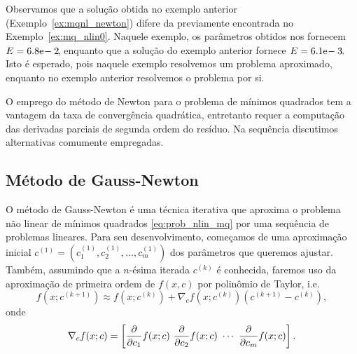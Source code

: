 \begin{ex}





\end{ex}

Observamos que a solução obtida no exemplo anterior (Exemplo~\ref{ex:mqnl_newton}) difere da previamente encontrada no Exemplo~\ref{ex:mq_nlin0}. Naquele exemplo, os parâmetros obtidos nos fornecem $E = 6.8\mathrm{e}\!-2\!$, enquanto que a solução do exemplo anterior fornece $E = 6.1\mathrm{e}\!-3\!$. Isto é esperado, pois naquele exemplo resolvemos um problema aproximado, enquanto no exemplo anterior resolvemos o problema por si.

O emprego do método de Newton para o problema de mínimos quadrados tem a vantagem da taxa de convergência quadrática, entretanto requer a computação das derivadas parciais de segunda ordem do resíduo. Na sequência discutimos alternativas comumente empregadas.

\subsection{Método de Gauss-Newton}
\badgeRevisar

O método de Gauss-Newton é uma técnica iterativa que aproxima o problema não linear de mínimos quadrados \eqref{eq:prob_nlin_mq} por uma sequência de problemas lineares. Para seu desenvolvimento, começamos de uma aproximação inicial $c^{(1)} = (c_1^{(1)}, c_2^{(1)}, \dotsc, c_m^{(1)})$ dos parâmetros que queremos ajustar. Também, assumindo que a $n$-ésima iterada $c^{(k)}$ é conhecida, faremos uso da aproximação de primeira ordem de $f(x,c)$ por polinômio de Taylor, i.e.
\begin{equation}
  f(x;c^{(k+1)}) \approx f(x;c^{(k)}) + \nabla_c f(x;c^{(k)})(c^{(k+1)}-c^{(k)}),
\end{equation}
onde
\begin{equation}
  \nabla_c f(x;c) = \left[\frac{\partial}{\partial c_1}f(x;c) ~\frac{\partial}{\partial c_2}f(x;c) ~\cdots ~\frac{\partial}{\partial c_m}f(x;c)\right].
\end{equation}


